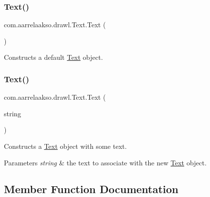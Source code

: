 \subsubsection{\texorpdfstring{Text()}{Text()}\hspace{0.1cm}{\footnotesize\ttfamily [1/2]}}
{\footnotesize\ttfamily com.\+aarrelaakso.\+drawl.\+Text.\+Text (\begin{DoxyParamCaption}{ }\end{DoxyParamCaption})}



Constructs a default \hyperlink{classcom_1_1aarrelaakso_1_1drawl_1_1_text}{Text} object. 

\mbox{\label{classcom_1_1aarrelaakso_1_1drawl_1_1_text_a5ed8ace51c474771273958290af944de}} 
\subsubsection{\texorpdfstring{Text()}{Text()}\hspace{0.1cm}{\footnotesize\ttfamily [2/2]}}
{\footnotesize\ttfamily com.\+aarrelaakso.\+drawl.\+Text.\+Text (\begin{DoxyParamCaption}\item[{@Not\+Null String}]{string }\end{DoxyParamCaption})}



Constructs a \hyperlink{classcom_1_1aarrelaakso_1_1drawl_1_1_text}{Text} object with some text. 


\begin{DoxyParams}{Parameters}
{\em string} & the text to associate with the new \hyperlink{classcom_1_1aarrelaakso_1_1drawl_1_1_text}{Text} object. \\
\hline
\end{DoxyParams}


\subsection{Member Function Documentation}
\mbox{\label{classcom_1_1aarrelaakso_1_1drawl_1_1_shape_ad2adcb85374cf5d6d59429628314e8d1}} 
